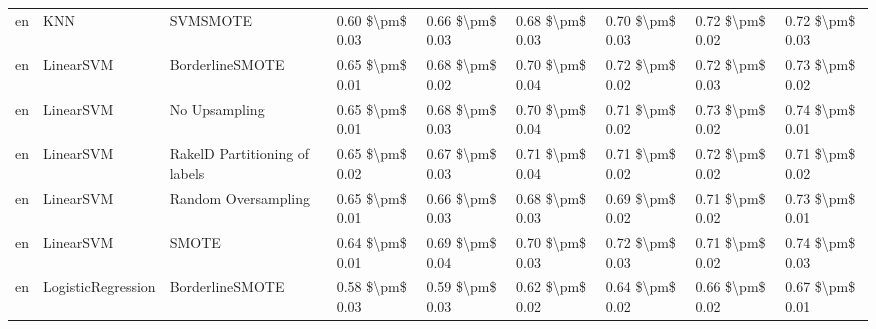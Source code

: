 \begin{tabular}{lllllllll}
      en &                             KNN &                      SVMSMOTE &     0.60 \$\textbackslash pm\$ 0.03 &           0.66 \$\textbackslash pm\$ 0.03 &       0.68 \$\textbackslash pm\$ 0.03 &        0.70 \$\textbackslash pm\$ 0.03 &                         0.72 \$\textbackslash pm\$ 0.02 &     0.72 \$\textbackslash pm\$ 0.03 \\
      en &                       LinearSVM &               BorderlineSMOTE &     0.65 \$\textbackslash pm\$ 0.01 &           0.68 \$\textbackslash pm\$ 0.02 &       0.70 \$\textbackslash pm\$ 0.04 &        0.72 \$\textbackslash pm\$ 0.02 &                         0.72 \$\textbackslash pm\$ 0.03 &     0.73 \$\textbackslash pm\$ 0.02 \\
      en &                       LinearSVM &                 No Upsampling &     0.65 \$\textbackslash pm\$ 0.01 &           0.68 \$\textbackslash pm\$ 0.03 &       0.70 \$\textbackslash pm\$ 0.04 &        0.71 \$\textbackslash pm\$ 0.02 &                         0.73 \$\textbackslash pm\$ 0.02 &     0.74 \$\textbackslash pm\$ 0.01 \\
      en &                       LinearSVM & RakelD Partitioning of labels &     0.65 \$\textbackslash pm\$ 0.02 &           0.67 \$\textbackslash pm\$ 0.03 &       0.71 \$\textbackslash pm\$ 0.04 &        0.71 \$\textbackslash pm\$ 0.02 &                         0.72 \$\textbackslash pm\$ 0.02 &     0.71 \$\textbackslash pm\$ 0.02 \\
      en &                       LinearSVM &           Random Oversampling &     0.65 \$\textbackslash pm\$ 0.01 &           0.66 \$\textbackslash pm\$ 0.03 &       0.68 \$\textbackslash pm\$ 0.03 &        0.69 \$\textbackslash pm\$ 0.02 &                         0.71 \$\textbackslash pm\$ 0.02 &     0.73 \$\textbackslash pm\$ 0.01 \\
      en &                       LinearSVM &                         SMOTE &     0.64 \$\textbackslash pm\$ 0.01 &           0.69 \$\textbackslash pm\$ 0.04 &       0.70 \$\textbackslash pm\$ 0.03 &        0.72 \$\textbackslash pm\$ 0.03 &                         0.71 \$\textbackslash pm\$ 0.02 &     0.74 \$\textbackslash pm\$ 0.03 \\
      en &              LogisticRegression &               BorderlineSMOTE &     0.58 \$\textbackslash pm\$ 0.03 &           0.59 \$\textbackslash pm\$ 0.03 &       0.62 \$\textbackslash pm\$ 0.02 &        0.64 \$\textbackslash pm\$ 0.02 &                         0.66 \$\textbackslash pm\$ 0.02 &     0.67 \$\textbackslash pm\$ 0.01 \\

\end{tabular}
